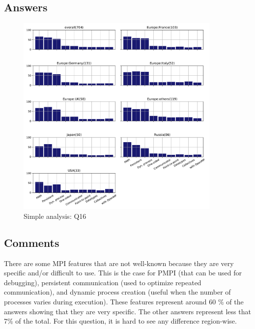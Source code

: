 
\subsection{Answers}



\begin{figure}[htb]
\begin{center}
\includegraphics[width=10cm]{../pdfs/Q16.pdf}
\caption{Simple analysis: Q16}
\label{fig:Q16}
\end{center}
\end{figure}

\subsection{Comments}

There are some MPI features that are not well-known because they are very
specific and/or difficult to use. This is the case for PMPI (that can be used for
debugging), persistent communication (used to optimize repeated communication),
and dynamic process creation (useful when the number of processes varies during
execution). These features represent around  60 \% of the answers showing that
they are very specific. The other answers represent less that 7\% of the
total.  For this question, it is hard to see any difference region-wise.
